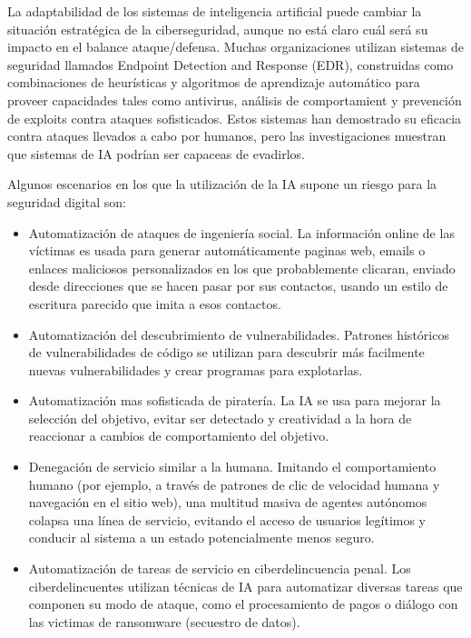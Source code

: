 \documentclass[12pt,a4paper]{article}
\begin{document}
La adaptabilidad de los sistemas de inteligencia artificial puede cambiar la situación estratégica de la ciberseguridad, aunque no está claro cuál será su impacto en el balance ataque/defensa. Muchas organizaciones utilizan sistemas de seguridad llamados Endpoint Detection and Response (EDR), construidas como combinaciones de heurísticas y algoritmos de aprendizaje automático para proveer capacidades tales como antivirus, análisis de comportamient y prevención de exploits contra ataques sofisticados. Estos sistemas han demostrado su eficacia contra ataques llevados a cabo por humanos, pero las investigaciones muestran que sistemas de IA podrían ser capaceas de evadirlos.

Algunos escenarios en los que la utilización de la IA supone un riesgo para la seguridad digital son:

\begin{itemize}

\item Automatización de ataques de ingeniería social. La información online de las víctimas es usada para generar automáticamente paginas web, emails o enlaces maliciosos personalizados en los que probablemente clicaran, enviado desde direcciones que se hacen pasar por sus contactos, usando un estilo de escritura parecido que imita a esos contactos.

\item Automatización del descubrimiento de vulnerabilidades. Patrones históricos de vulnerabilidades de código se utilizan para descubrir más facilmente nuevas vulnerabilidades y crear programas para explotarlas.

\item Automatización mas sofisticada de piratería. La IA se usa para mejorar la selección del objetivo, evitar ser detectado y creatividad a la hora de reaccionar a cambios de comportamiento del objetivo.

\item Denegación de servicio similar a la humana. Imitando el comportamiento humano (por ejemplo, a través de patrones de clic de velocidad humana y navegación en el sitio web), una multitud masiva de agentes autónomos colapsa una línea de servicio, evitando el acceso de usuarios legítimos y conducir al sistema a un estado potencialmente menos seguro.

\item Automatización de tareas de servicio en ciberdelincuencia penal. Los ciberdelincuentes utilizan técnicas de IA para automatizar diversas tareas que componen su modo de ataque, como el procesamiento de pagos o diálogo con las victimas de ransomware (secuestro de datos).


\end{itemize}
\end{document}
